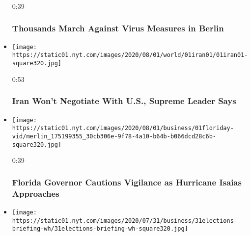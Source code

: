 \begin{itemize}
  0:39

  \hypertarget{thousands-march-against-virus-measures-in-berlin}{%
  \subsubsection{Thousands March Against Virus Measures in
  Berlin}\label{thousands-march-against-virus-measures-in-berlin}}
\item
  \href{https://www.nytimes.com/video/world/middleeast/100000007268443/iran-united-states-nuclear-program-negotiation.html?action=click\&module=video-series-bar\&region=header\&pgtype=Article\&playlistId=video/latest-video}{}

  \texttt{[image: https://static01.nyt.com/images/2020/08/01/world/01iran01/01iran01-square320.jpg]}

  0:53

  \hypertarget{iran-wont-negotiate-with-us-supreme-leader-says}{%
  \subsubsection{Iran Won't Negotiate With U.S., Supreme Leader
  Says}\label{iran-wont-negotiate-with-us-supreme-leader-says}}
\item
  \href{https://www.nytimes.com/video/us/100000007268424/desantis-florida-hurricane-isaias.html?action=click\&module=video-series-bar\&region=header\&pgtype=Article\&playlistId=video/latest-video}{}

  \texttt{[image: https://static01.nyt.com/images/2020/08/01/business/01floriday-vid/merlin\_175199355\_30cb306e-9f78-4a10-b64b-b066dcd28c6b-square320.jpg]}

  0:39

  \hypertarget{florida-governor-cautions-vigilance-as-hurricane-isaias-approaches}{%
  \subsubsection{Florida Governor Cautions Vigilance as Hurricane Isaias
  Approaches}\label{florida-governor-cautions-vigilance-as-hurricane-isaias-approaches}}
\item
  \href{https://www.nytimes.com/video/us/100000007267362/white-house-mail-in-ballots-election.html?action=click\&module=video-series-bar\&region=header\&pgtype=Article\&playlistId=video/latest-video}{}

  \texttt{[image: https://static01.nyt.com/images/2020/07/31/business/31elections-briefing-wh/31elections-briefing-wh-square320.jpg]}


\end{itemize}
